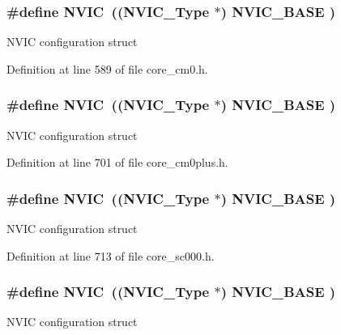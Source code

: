 \subsubsection[{\texorpdfstring{N\+V\+IC}{NVIC}}]{\setlength{\rightskip}{0pt plus 5cm}\#define N\+V\+IC~(({\bf N\+V\+I\+C\+\_\+\+Type}      $\ast$)     {\bf N\+V\+I\+C\+\_\+\+B\+A\+SE}     )}\hypertarget{group___c_m_s_i_s__core__base_gac8e97e8ce56ae9f57da1363a937f8a17}{}\label{group___c_m_s_i_s__core__base_gac8e97e8ce56ae9f57da1363a937f8a17}
N\+V\+IC configuration struct 

Definition at line 589 of file core\+\_\+cm0.\+h.

\subsubsection[{\texorpdfstring{N\+V\+IC}{NVIC}}]{\setlength{\rightskip}{0pt plus 5cm}\#define N\+V\+IC~(({\bf N\+V\+I\+C\+\_\+\+Type}      $\ast$)     {\bf N\+V\+I\+C\+\_\+\+B\+A\+SE}     )}\hypertarget{group___c_m_s_i_s__core__base_gac8e97e8ce56ae9f57da1363a937f8a17}{}\label{group___c_m_s_i_s__core__base_gac8e97e8ce56ae9f57da1363a937f8a17}
N\+V\+IC configuration struct 

Definition at line 701 of file core\+\_\+cm0plus.\+h.

\subsubsection[{\texorpdfstring{N\+V\+IC}{NVIC}}]{\setlength{\rightskip}{0pt plus 5cm}\#define N\+V\+IC~(({\bf N\+V\+I\+C\+\_\+\+Type}      $\ast$)     {\bf N\+V\+I\+C\+\_\+\+B\+A\+SE}     )}\hypertarget{group___c_m_s_i_s__core__base_gac8e97e8ce56ae9f57da1363a937f8a17}{}\label{group___c_m_s_i_s__core__base_gac8e97e8ce56ae9f57da1363a937f8a17}
N\+V\+IC configuration struct 

Definition at line 713 of file core\+\_\+sc000.\+h.

\subsubsection[{\texorpdfstring{N\+V\+IC}{NVIC}}]{\setlength{\rightskip}{0pt plus 5cm}\#define N\+V\+IC~(({\bf N\+V\+I\+C\+\_\+\+Type}      $\ast$)     {\bf N\+V\+I\+C\+\_\+\+B\+A\+SE}     )}\hypertarget{group___c_m_s_i_s__core__base_gac8e97e8ce56ae9f57da1363a937f8a17}{}\label{group___c_m_s_i_s__core__base_gac8e97e8ce56ae9f57da1363a937f8a17}
N\+V\+IC configuration struct 

